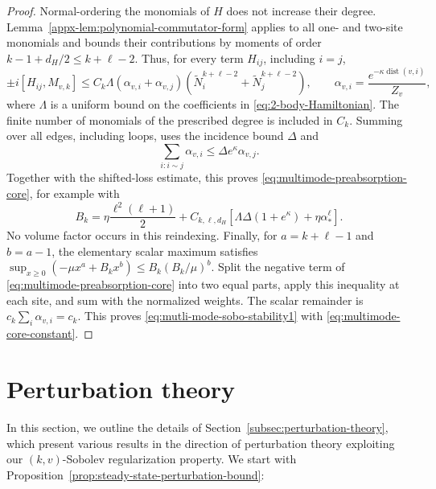 \documentclass[11pt]{article}
\theoremstyle{myplain}
\theoremstyle{mydefinition}
\theoremstyle{remark}
\DeclareMathOperator{\dist}{dist}
\DeclareMathOperator{\1}{\mathds{1}}
\begin{document}
\begin{proof}
            Normal-ordering the monomials of $H$ does not increase their degree. Lemma~\ref{appx-lem:polynomial-commutator-form} applies to all one- and two-site monomials and bounds their contributions by moments of order $k - 1 + d_H/2 \le k + \ell - 2$. Thus, for every term $H_{ij}$, including $i = j$,
            \begin{equation}
                \pm i[H_{ij}, M_{v,k}]
                \le C_k \Lambda (\alpha_{v,i} + \alpha_{v,j})
                (\widetilde N_i^{k+\ell-2} + \widetilde N_j^{k+\ell-2}),\qquad
                \alpha_{v,i} = \frac{e^{-\kappa\dist(v,i)}}{Z_v},
            \end{equation}
            where $\Lambda$ is a uniform bound on the coefficients in \eqref{eq:2-body-Hamiltonian}. The finite number of monomials of the prescribed degree is included in $C_k$. Summing over all edges, including loops, uses the incidence bound $\Delta$ and
            \begin{equation}
                \sum_{i:i\sim j}\alpha_{v,i}
                \le\Delta e^\kappa\alpha_{v,j}.
            \end{equation}
            Together with the shifted-loss estimate, this proves \eqref{eq:multimode-preabsorption-core}, for example with
            \begin{equation}
                B_k=\eta\frac{\ell^2(\ell+1)}2
                +C_{k,\ell,d_H}
                \left[\Lambda\Delta(1+e^\kappa)
                +\eta\alpha_*^\ell\right].
            \end{equation}
            No volume factor occurs in this reindexing.  Finally, for $a=k+\ell-1$ and $b=a-1$, the elementary scalar maximum satisfies $\sup_{x\ge0}(-\mu x^a+B_kx^b)\le B_k(B_k/\mu)^b$. Split the negative term of \eqref{eq:multimode-preabsorption-core} into two equal parts, apply this inequality at each site, and sum with the normalized weights. The scalar remainder is $c_k\sum_i\alpha_{v,i}=c_k$. This proves \eqref{eq:mutli-mode-sobo-stability1} with \eqref{eq:multimode-core-constant}.


            
        \end{proof}
        


\section{Perturbation theory}\label{appx:perturbation theory}
    In this section, we outline the details of Section~\ref{subsec:perturbation-theory}, which present various results in the direction of perturbation theory exploiting our $(k,v)$-Sobolev regularization property. We start with Proposition~\ref{prop:steady-state-perturbation-bound}:
    
\end{document}
